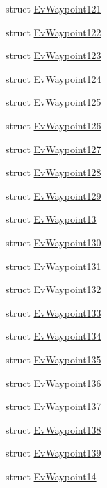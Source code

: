 \begin{DoxyCompactItemize}
struct \hyperlink{structcl__move__base__z_1_1EvWaypoint121}{Ev\+Waypoint121}
\item 
struct \hyperlink{structcl__move__base__z_1_1EvWaypoint122}{Ev\+Waypoint122}
\item 
struct \hyperlink{structcl__move__base__z_1_1EvWaypoint123}{Ev\+Waypoint123}
\item 
struct \hyperlink{structcl__move__base__z_1_1EvWaypoint124}{Ev\+Waypoint124}
\item 
struct \hyperlink{structcl__move__base__z_1_1EvWaypoint125}{Ev\+Waypoint125}
\item 
struct \hyperlink{structcl__move__base__z_1_1EvWaypoint126}{Ev\+Waypoint126}
\item 
struct \hyperlink{structcl__move__base__z_1_1EvWaypoint127}{Ev\+Waypoint127}
\item 
struct \hyperlink{structcl__move__base__z_1_1EvWaypoint128}{Ev\+Waypoint128}
\item 
struct \hyperlink{structcl__move__base__z_1_1EvWaypoint129}{Ev\+Waypoint129}
\item 
struct \hyperlink{structcl__move__base__z_1_1EvWaypoint13}{Ev\+Waypoint13}
\item 
struct \hyperlink{structcl__move__base__z_1_1EvWaypoint130}{Ev\+Waypoint130}
\item 
struct \hyperlink{structcl__move__base__z_1_1EvWaypoint131}{Ev\+Waypoint131}
\item 
struct \hyperlink{structcl__move__base__z_1_1EvWaypoint132}{Ev\+Waypoint132}
\item 
struct \hyperlink{structcl__move__base__z_1_1EvWaypoint133}{Ev\+Waypoint133}
\item 
struct \hyperlink{structcl__move__base__z_1_1EvWaypoint134}{Ev\+Waypoint134}
\item 
struct \hyperlink{structcl__move__base__z_1_1EvWaypoint135}{Ev\+Waypoint135}
\item 
struct \hyperlink{structcl__move__base__z_1_1EvWaypoint136}{Ev\+Waypoint136}
\item 
struct \hyperlink{structcl__move__base__z_1_1EvWaypoint137}{Ev\+Waypoint137}
\item 
struct \hyperlink{structcl__move__base__z_1_1EvWaypoint138}{Ev\+Waypoint138}
\item 
struct \hyperlink{structcl__move__base__z_1_1EvWaypoint139}{Ev\+Waypoint139}
\item 
struct \hyperlink{structcl__move__base__z_1_1EvWaypoint14}{Ev\+Waypoint14}
\item 

\end{DoxyCompactItemize}
